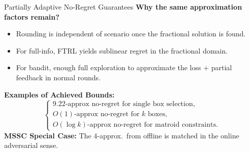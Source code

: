 \documentclass{beamer}
\begin{document}
    \begin{frame}{Partially Adaptive No-Regret Guarantees}
    \textbf{Why the same approximation factors remain?}
    \begin{itemize}
        \item Rounding is independent of scenario once the fractional solution is found.
        \item For full-info, FTRL yields sublinear regret in the fractional domain.
        \item For bandit, enough full exploration to approximate the loss + partial feedback in normal rounds.
    \end{itemize}
    
    \textbf{Examples of Achieved Bounds:}
    \[
    \begin{cases}
    9.22\text{-approx no-regret for single box selection,}\\
    O(1)\text{-approx no-regret for $k$ boxes,}\\
    O(\log k)\text{-approx no-regret for matroid constraints.}
    \end{cases}
    \]
    \textbf{MSSC Special Case:} The 4-approx.\ from offline is matched in the online adversarial sense.
    \end{frame}
    
\end{document}
